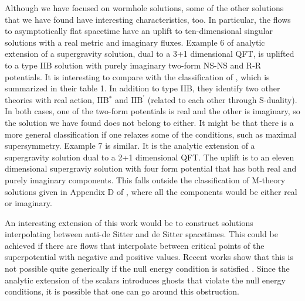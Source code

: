 Although we have focused on wormhole solutions, some of the other solutions that we have found have interesting characteristics, too. In particular, the flows to asymptotically flat spacetime have an uplift to ten-dimensional singular solutions with a real metric and imaginary fluxes. Example 6 of analytic extension of a supergravity solution, dual to a 3+1 dimensional QFT, is uplifted to a type IIB solution with purely imaginary two-form NS-NS and R-R  potentials. It is interesting to compare with the classification of \cite{Bergshoeff:2007cg}, which is summarized in their table 1. In addition to type IIB, they identify two other theories with real action, IIB${}^*$ and $\text{IIB}^\prime$ (related to each other through S-duality). In both cases, one of the two-form potentials is real and the other is imaginary, so the solution we have found does not belong to either. It might be that there is a more general classification if one relaxes some of the conditions, such as maximal supersymmetry. Example 7 is similar. It is the analytic extension of a supergravity solution dual to a 2+1 dimensional QFT. The uplift is to an eleven dimensional supergraviy solution with four form potential that has both real and purely imaginary components. This falls outside the classification of M-theory solutions given in Appendix D of \cite{Bergshoeff:2007cg}, where all the components would be either real or imaginary.

An interesting extension of this work would be to construct solutions interpolating between anti-de Sitter and de Sitter spacetimes. This could be achieved if there are flows that interpolate between critical points of the superpotential with negative and positive values. Recent works show that this is not possible quite generically if the null energy condition is satisfied \cite{Kiritsis:2019wyk,Kiritsis:2025ytb}. Since the analytic extension of the scalars introduces ghosts that violate the null energy conditions, it is possible that one can go around this obstruction.

